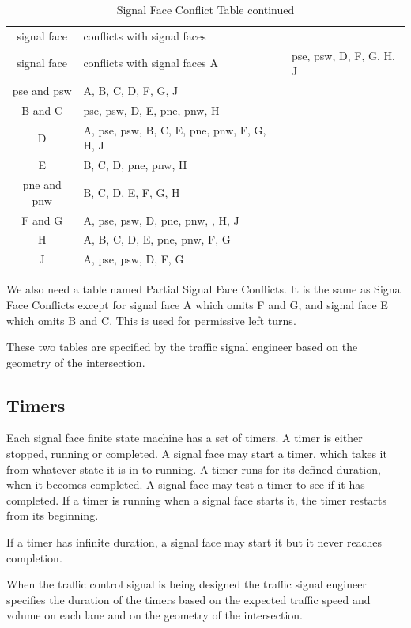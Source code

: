 \documentclass[letterpaper,twoside]{article}
\begin{document}
\begin{longtable}{c | l}
  \caption{Signal Face Conflict Table} \\
  signal face & conflicts with signal faces \endfirsthead
  \caption{Signal Face Conflict Table continued} \\
  signal face & conflicts with signal faces \endhead
  \hline
  A & pse, psw, D, F, G, H, J \\
  pse and psw & A, B, C, D, F, G, J \\
  B and C & pse, psw, D, E, pne, pnw, H \\
  D & A, pse, psw, B, C, E, pne, pnw, F, G, H, J \\
  E & B, C, D, pne, pnw, H \\
  pne and pnw & B, C, D, E, F, G, H \\
  F and G & A, pse, psw, D, pne, pnw, , H, J \\
  H & A, B, C, D, E, pne, pnw, F, G \\
  J & A, pse, psw, D, F, G \\
\end{longtable}

We also need a table named Partial Signal Face Conflicts.  It is the same
as Signal Face Conflicts except for signal face A which omits F and G,
and signal face E which omits B and C.  This is used for permissive
left turns.

These two tables are specified by the traffic signal engineer
based on the geometry of the intersection.

\subsection{Timers}

Each signal face finite state machine has a set of timers.
A timer is either stopped, running
or completed.  A signal face may start a timer, which takes it from
whatever state it is in to running.  A timer runs for its defined duration,
when it becomes completed.  A signal face may test a timer to see if
it has completed.  If a timer is running when a signal face starts it,
the timer restarts from its beginning.

If a timer has infinite duration, a signal face may start it but
it never reaches completion.

When the traffic control signal is being designed the traffic signal engineer
specifies
the duration of the timers based on the expected traffic speed and volume on
each lane and on the geometry of the intersection.
\end{document}
